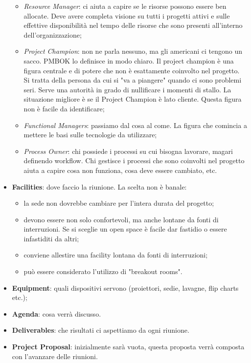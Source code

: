 \begin{itemize}
\begin{itemize}
		\item \textit{Resource Manager}: ci aiuta a capire se le risorse possono essere ben allocate. Deve avere completa visione su tutti i progetti attivi e sulle effettive disponibilità nel tempo delle risorse che sono presenti all'interno dell'organizzazione;
		\item \textit{Project Champion}: non ne parla nessuno, ma gli americani ci tengono un sacco. PMBOK lo definisce in modo chiaro. Il project champion è una figura centrale e di potere che non è esattamente coinvolto nel progetto. Si tratta della persona da cui si "va a piangere" quando ci sono problemi seri. Serve una autorità in grado di nullificare i momenti di stallo. La situazione migliore è se il Project Champion è lato cliente. Questa figura non è facile da identificare;
		\item \textit{Functional Managers}: passiamo dal cosa al come. La figura che comincia a mettere le basi sulle tecnologie da utilizzare;
		\item \textit{Process Owner}: chi possiede i processi su cui bisogna lavorare, magari definendo workflow. Chi gestisce i processi che sono coinvolti nel progetto aiuta a capire cosa non funziona, cosa deve essere cambiato, etc.
	\end{itemize}
	\item \textbf{Facilities}: dove faccio la riunione. La scelta non è banale:
	\begin{itemize}
		\item la sede non dovrebbe cambiare per l'intera durata del progetto;
		\item devono essere non solo confortevoli, ma anche lontane da fonti di interruzioni. Se si sceglie un open space è facile dar fastidio o essere infastiditi da altri;
		\item conviene allestire una facility lontana da fonti di interruzioni;
		\item può essere considerato l'utilizzo di "breakout rooms".
	\end{itemize}
	\item \textbf{Equipment}: quali dispositivi servono (proiettori, sedie, lavagne, flip charts etc.);
	\item \textbf{Agenda}: cosa verrà discusso.
	\item \textbf{Deliverables}: che risultati ci aspettiamo da ogni riunione.
	\item \textbf{Project Proposal}: inizialmente sarà vuota, questa proposta verrà composta con l'avanzare delle riunioni.
\end{itemize}
